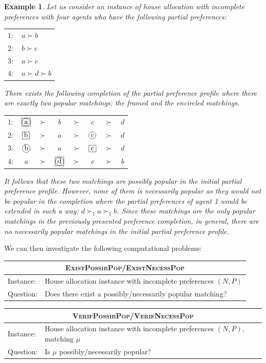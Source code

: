 \documentclass{article}
\newtheorem{example}{Example}
\newcommand{\match}{\mu}
\newcommand*\encircled[1]{\tikz[baseline=(char.base)]{
            \node[shape=circle,draw,inner sep=0.25pt,minimum size=1em] (char) {\vphantom{Ag}#1};}}
\newcommand*\framed[1]{\tikz[baseline=(char.base)]{
            \node[draw,inner sep=0.25pt,minimum size=1em] (char) {\vphantom{Ag}#1};}}
\begin{document}
\begin{example}
Let us consider an instance of house allocation with incomplete preferences with four agents who have the following partial preferences:
\begin{center}
\begin{tabular}{ll}
$1:$ & $a\succ b$ \\
$2:$ & $b\succ c$ \\
$3:$ & $a\succ c$ \\
$4:$ & $a\succ d\succ b$
\end{tabular}
\end{center}
There exists the following completion of the partial preference profile where there are exactly two popular matchings: the framed and the encircled matchings.
\begin{center}
\begin{tabular}{*{8}{c}}
$1:$ & $\framed{\encircled{a}}$ & $\succ$ & $b$ & $\succ$ & $c$ & $\succ$ & $d$ \\
$2:$ & $\framed{b}$ & $\succ$ & $a$ & $\succ$ & $\encircled{c}$ & $\succ$ & $d$ \\
$3:$ & $\encircled{b}$ & $\succ$ & $a$ & $\succ$ & $\framed{c}$ & $\succ$ & $d$ \\
$4:$ & $a$ & $\succ$ & $\framed{\encircled{d}}$ & $\succ$ & $c$ & $\succ$ & $b$
\end{tabular}
\end{center}
It follows that these two matchings are possibly popular in the initial partial preference profile. 
However, none of them is necessarily popular as they would not be popular in the completion where the partial preferences of agent 1 would be extended in such a way: $d \succ_1 a \succ_1 b$.  
Since these matchings are the only popular matchings in the previously presented preference completion, in general, there are no necessarily popular matchings in the initial partial preference profile.
\end{example}

We can then investigate the following computational problems:
\smallbreak
\begin{tabular}{ll}
\toprule
\multicolumn{2}{c}{\textsc{ExistPossibPop}/\textsc{ExistNecessPop}} \\
\midrule
Instance: & House allocation instance with incomplete preferences $(N,P)$ \\
Question: & Does there exist a possibly/necessarily popular matching? \\
\bottomrule
\end{tabular}

\smallbreak
\begin{tabular}{ll}
\toprule
\multicolumn{2}{c}{\textsc{VerifPossibPop}/\textsc{VerifNecessPop}} \\
\midrule
Instance: & House allocation instance with incomplete preferences $(N,P)$, matching $\match$ \\
Question: & Is $\match$ possibly/necessarily popular? \\
\bottomrule
\end{tabular}



\end{document}

